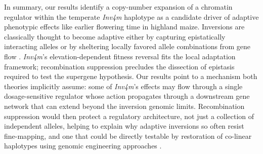 \documentclass[9pt,twocolumn,twoside]{rilabRxiv}
\newcommand{\invfour}{\textit{Inv4m}\xspace}
\begin{document}

In summary, our results identify a copy-number expansion of a chromatin regulator within the temperate \invfour haplotype as a candidate driver of adaptive phenotypic effects like earlier flowering time in highland maize.
Inversions are classically thought to become adaptive either by capturing epistatically interacting alleles \citep{dobzhansky1971genetics} or by sheltering locally favored allele combinations from gene flow \citep{kirkpatrick2006, kirkpatrick2010}.
\invfour's elevation-dependent fitness reversal \citep{crow2020} fits the local adaptation framework; recombination suppression precludes the dissection of epistasis required to test the supergene hypothesis. 
Our results point to a mechanism both theories implicitly assume: some of \invfour's effects may flow through a single dosage-sensitive regulator whose action propagates through a downstream gene network that can extend beyond the inversion genomic limits.
Recombination suppression would then protect a regulatory architecture, not just a collection of independent alleles, helping to explain why adaptive inversions so often resist fine-mapping, and one that could be directly testable by restoration of co-linear haplotypes using genomic engineering approaches \citep{Schwartz2020-el}.
\end{document}

